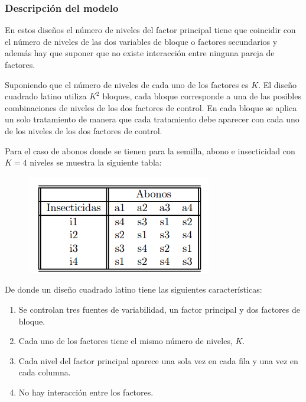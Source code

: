 \subsubsection{Descripción del modelo}

En estos diseños el número de niveles del factor principal tiene que coincidir con el número de niveles de las dos variables de bloque o factores secundarios y además hay que suponer que no existe interacción entre ninguna pareja de factores.

Suponiendo que el número de niveles de cada uno de los factores es $K$. El diseño cuadrado latino utiliza $K^2$ bloques, cada bloque corresponde a una de las posibles combinaciones de niveles de los dos factores de control. En cada bloque se aplica un solo tratamiento de manera que cada tratamiento debe aparecer con cada uno de los niveles de los dos factores de control.

Para el caso de abonos donde se tienen para la semilla, abono e insecticidad con $K=4$ niveles se muestra la siguiente tabla:

\begin{figure}[h!]
    \begin{tcolorbox}[colback=white, colframe=black, boxrule=1.5pt, sharp corners=all]
          \begin{center}
            {\includegraphics[scale=1.5]{images/img1.png}}
          \end{center}
        \end{tcolorbox}
\end{figure}

De donde un diseño cuadrado latino tiene las siguientes características:

\begin{enumerate}
  \item Se controlan tres fuentes de variabilidad, un factor principal y dos factores de bloque.
  \item Cada uno de los factores tiene el mismo número de niveles, $K$.
  \item Cada nivel del factor principal aparece una sola vez en cada fila y una vez en cada columna.
  \item No hay interacción entre los factores.
\end{enumerate}

